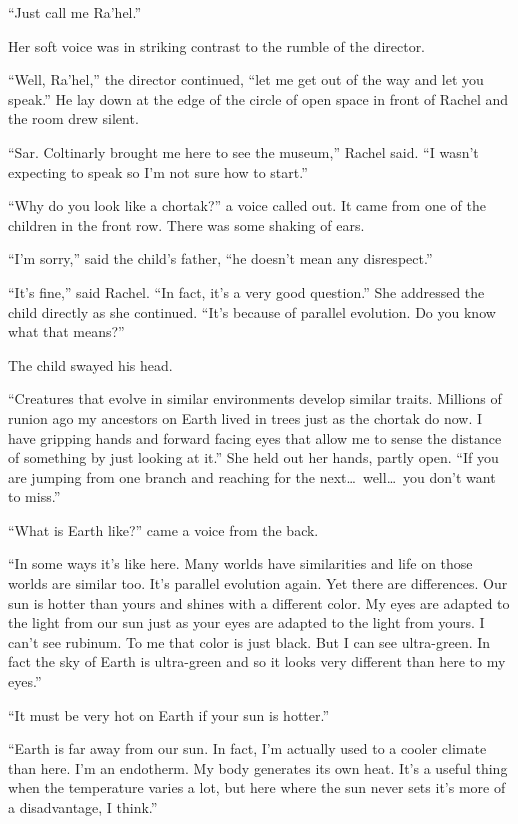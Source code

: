 ``Just call me Ra'hel.''

Her soft voice was in striking contrast to the rumble of the director.

``Well, Ra'hel,'' the director continued, ``let me get out of the way and let you speak.'' He
lay down at the edge of the circle of open space in front of Rachel and the room drew silent.

``Sar. Coltinarly brought me here to see the museum,'' Rachel said. ``I wasn't expecting to
speak so I'm not sure how to start.''

``Why do you look like a chortak?'' a voice called out. It came from one of the children in the
front row. There was some shaking of ears.

``I'm sorry,'' said the child's father, ``he doesn't mean any disrespect.''

``It's fine,'' said Rachel. ``In fact, it's a very good question.'' She addressed the child
directly as she continued. ``It's because of parallel evolution. Do you know what that means?''

The child swayed his head.

``Creatures that evolve in similar environments develop similar traits. Millions of runion ago
my ancestors on Earth lived in trees just as the chortak do now. I have gripping hands and
forward facing eyes that allow me to sense the distance of something by just looking at it.''
She held out her hands, partly open. ``If you are jumping from one branch and reaching for the
next\ldots\ well\ldots\ you don't want to miss.''

``What is Earth like?'' came a voice from the back.

``In some ways it's like here. Many worlds have similarities and life on those worlds are
similar too. It's parallel evolution again. Yet there are differences. Our sun is hotter than
yours and shines with a different color. My eyes are adapted to the light from our sun just as
your eyes are adapted to the light from yours. I can't see rubinum. To me that color is just
black. But I can see ultra-green. In fact the sky of Earth is ultra-green and so it looks very
different than here to my eyes.''

``It must be very hot on Earth if your sun is hotter.''

``Earth is far away from our sun. In fact, I'm actually used to a cooler climate than here. I'm
an endotherm. My body generates its own heat. It's a useful thing when the temperature varies a
lot, but here where the sun never sets it's more of a disadvantage, I think.''

